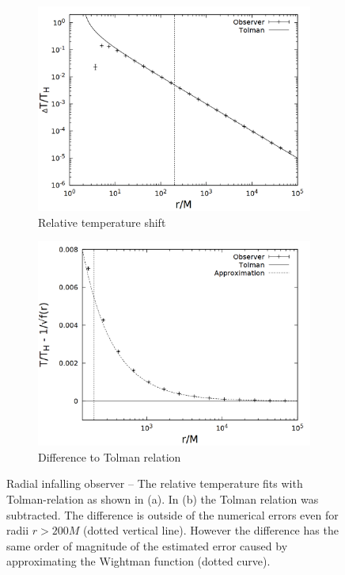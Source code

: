\begin{figure}[h]
  \centering
  \begin{subfigure}[h]{0.5\textwidth}
    \centering
    \includegraphics[width=\textwidth]{cpp/final/rad.png}
    \caption{Relative temperature shift}
  \end{subfigure}%
  \begin{subfigure}[h]{0.5\textwidth}
    \centering
    \includegraphics[width=\textwidth]{cpp/final/rad_tolman_error.png}
    \caption{Difference to Tolman relation}
  \end{subfigure}
  \caption[Radial infalling observer]{Radial infalling observer -- The relative temperature fits with Tolman-relation as shown in (a). In (b) the Tolman relation was subtracted. The difference is outside of the numerical errors even for radii \(r > 200 M\) (dotted vertical line). However the difference has the same order of magnitude of the estimated error caused by approximating the Wightman function (dotted curve).}
  \label{fig:bh_rad}
\end{figure}


